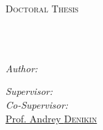 \documentclass[
12pt, %
oneside, %
english, %
doublespacing, %
doublespacing, %
toctotoc, %
parskip, %
headsepline, %
]{MastersDoctoralThesis} %
\author{Bakytzhan \textsc{Urazbekov}} %
\begin{document}
\onehalfspacing
\frontmatter %

\pagestyle{plain} %


\begin{titlepage}
\begin{center}

{\scshape\LARGE \univname\par}\vspace{1.5cm} %
\textsc{\Large Doctoral Thesis}\\[0.5cm] %

\HRule \\[0.4cm] %
{\huge \bfseries \ttitle\par}\vspace{0.4cm} %
\HRule \\[1.5cm] %
 
\begin{minipage}[t]{0.4\textwidth}
\begin{flushleft} \large
\emph{Author:}\\
\href{https://www.researchgate.net/profile/Bakytzhan_Urazbekov}{\authorname} %
\end{flushleft}
\end{minipage}
\begin{minipage}[t]{0.4\textwidth}
\begin{flushright} \large
\emph{Supervisor:} \\
\href{https://www.researchgate.net/profile/Nunzio_Itaco}{\supname} %
\emph{Co-Supervisor:} \\
\href{https://www.researchgate.net/profile/A_Denikin}{Prof. Andrey \textsc{Denikin}} %
\end{flushright}
\end{minipage}
\\[3cm] 

\deptname
\\[1cm] %
 

\end{center}
\end{titlepage}
\end{document}
